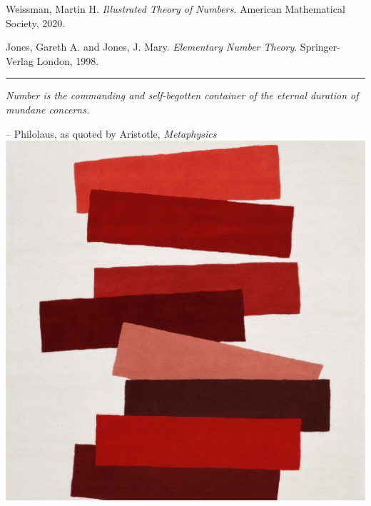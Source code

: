 \begin{enumerate}[leftmargin=*,itemsep=1em,label={[\arabic*]}]
\item Weissman, Martin H. \emph{Illustrated Theory of Numbers}. American Mathematical Society, 2020.
\item Jones, Gareth A. and Jones, J. Mary. \emph{Elementary Number Theory}.  Springer-Verlag London, 1998.
\end{enumerate}
%
\vspace*{5em}
%
\centering
\hrule
\vspace*{\fill}
\begin{center}
\emph{Number is the commanding and self-begotten container of the eternal duration of mundane concerns.}
\end{center}
\vspace*{-1em}
\hfill {\footnotesize -- Philolaus, as quoted by Aristotle, \textsl{Metaphysics}}\\[2em]
\includegraphics[scale=0.25]{Christopher-Farr-Editions-Josef-Albers-Many-Faces-of-Red.jpg}
\vspace*{\fill}

